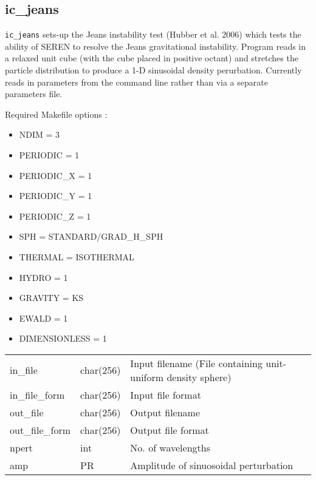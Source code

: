 \documentclass[a4paper]{article}
\newcommand{\NAME}{SEREN }
\newcommand{\var}[1]{\texttt{#1}}
\begin{document}
\subsection{ic\_jeans}
\var{ic\_jeans} sets-up the Jeans instability test (Hubber et al. 2006) which tests the ability of \NAME to resolve the Jeans gravitational instability.  Program reads in a relaxed unit cube (with the cube placed in positive octant) and stretches the particle distribution to produce a 1-D sinusoidal density perurbation.  Currently reads in parameters from the command line rather than via a separate parameters file. \newline

\noindent Required Makefile options :
\begin{itemize}
\item NDIM = 3
\item PERIODIC = 1
\item PERIODIC\_X = 1
\item PERIODIC\_Y = 1
\item PERIODIC\_Z = 1
\item SPH = STANDARD/GRAD\_H\_SPH
\item THERMAL = ISOTHERMAL
\item HYDRO = 1
\item GRAVITY = KS
\item EWALD = 1
\item DIMENSIONLESS = 1
\end{itemize}

\vspace{0.1cm}

\begin{center}
\begin{supertabular}{|p{3cm}|p{2cm}|p{8cm}|}
in\_file         & char(256) & Input filename (File containing unit-uniform density sphere)\\
in\_file\_form   & char(256) & Input file format \\
out\_file        & char(256) & Output filename \\
out\_file\_form  & char(256) & Output file format \\
npert            & int       & No. of wavelengths \\
amp              & PR        & Amplitude of sinuosoidal perturbation \\
\end{supertabular}
\end{center}
\end{document}

